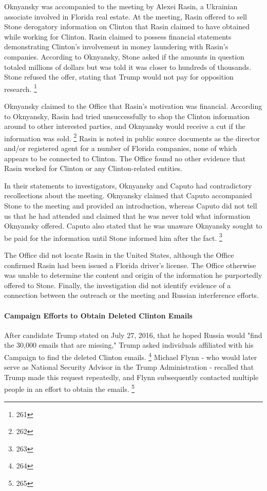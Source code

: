 Oknyansky was accompanied to the meeting by Alexei Rasin, a Ukrainian associate involved in Florida real estate.
At the meeting, Rasin offered to sell Stone derogatory information on Clinton that Rasin claimed to have obtained while working for Clinton.
Rasin claimed to possess financial statements demonstrating Clinton's involvement in money laundering with Rasin's companies.
According to Oknyansky, Stone asked if the amounts in question totaled millions of dollars but was told it was closer to hundreds of thousands.
Stone refused the offer, stating that Trump would not pay for opposition research.%
\footnote{261}

Oknyansky claimed to the Office that Rasin's motivation was financial.
According to Oknyansky, Rasin had tried unsuccessfully to shop the Clinton information around to other interested parties, and Oknyansky would receive a cut if the information was sold.%
\footnote{262}
Rasin is noted in public source documents as the director and/or registered agent for a number of Florida companies, none of which appears to be connected to Clinton.
The Office found no other evidence that Rasin worked for Clinton or any Clinton-related entities.

In their statements to investigators, Oknyansky and Caputo had contradictory recollections about the meeting.
Oknyansky claimed that Caputo accompanied Stone to the meeting and provided an introduction, whereas Caputo did not tell us that he had attended and claimed that he was never told what information Oknyansky offered.
Caputo also stated that he was unaware Oknyansky sought to be paid for the information until Stone informed him after the fact.%
\footnote{263}

The Office did not locate Rasin in the United States, although the Office confirmed Rasin had been issued a  Florida driver's license.
The Office otherwise was unable to determine the content and origin of the information he purportedly offered to Stone.
Finally, the investigation did not identify evidence of a connection between the outreach or the meeting and Russian interference efforts.

\paragraph{Campaign Efforts to Obtain Deleted Clinton Emails}

After candidate Trump stated on July 27, 2016, that he hoped Russia would "find the 30,000 emails that are missing," Trump asked individuals affiliated with his Campaign to find the deleted Clinton emails.%
\footnote{264}
Michael Flynn - who would later serve as National Security Advisor in the Trump Administration - recalled that Trump made this request repeatedly, and Flynn subsequently contacted multiple people in an effort to obtain the emails.%
\footnote{265}

